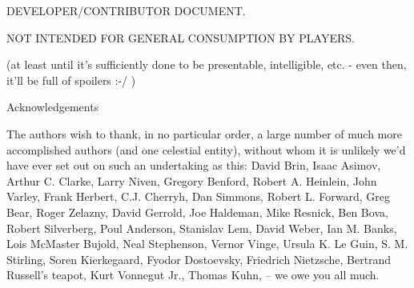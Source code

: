 \vspace{1cm}
\centerline{\LARGE DEVELOPER/CONTRIBUTOR DOCUMENT.}
\centerline{\LARGE NOT INTENDED FOR GENERAL CONSUMPTION BY PLAYERS.}
\vspace{0.5cm}
\centerline{(at least until it's sufficiently done to be presentable, intelligible, etc. - even then, it'll be full of spoilers :-/ )}
\vspace{3cm}
\clearpage
{\centerline{\LARGE Acknowledgements}}
\vspace{2cm}
{\rm 

The authors wish to thank, in no particular order, a large number of
much more accomplished authors (and one celestial entity), without
whom it is unlikely we'd have ever set out on such an undertaking as
this: David Brin, Isaac Asimov, Arthur C. Clarke, Larry Niven, Gregory
Benford, Robert A. Heinlein, John Varley, Frank Herbert, C.J. Cherryh,
Dan Simmons, Robert L. Forward, Greg Bear, Roger Zelazny, David
Gerrold, Joe Haldeman, Mike Resnick, Ben Bova, Robert Silverberg, Poul
Anderson, Stanislav Lem, David Weber, Ian M. Banks, Lois McMaster
Bujold, Neal Stephenson, Vernor Vinge, Ursula K. Le Guin,
S. M. Stirling, Soren Kierkegaard, Fyodor Dostoevsky, Friedrich
Nietzsche, Bertrand Russell's teapot, Kurt Vonnegut Jr., Thomas Kuhn,
-- we owe you all much.

}
